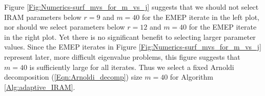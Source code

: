Figure \ref{Fig:Numerics-surf_mvs_for_m_vs_j} suggests that we should not select IRAM parameters below $r = 9$ and $m = 40$ for the EMEP iterate in the left plot, nor should we select parameters below $r = 12$ and $m = 40$ for the EMEP iterate in the right plot.  
Yet there is no significant benefit to selecting larger parameter values.
Since the EMEP iterates in Figure \ref{Fig:Numerics-surf_mvs_for_m_vs_j} represent later, more difficult eigenvalue problems, this figure suggests that $m = 40$ is sufficiently large for all iterates.
Thus we select a fixed Arnoldi decomposition (\ref{Eqn:Arnoldi_decomp}) size $m = 40$ for Algorithm \ref{Alg:adaptive_IRAM}.






